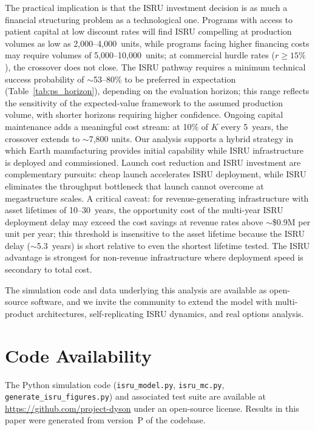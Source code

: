 \documentclass[preprint,12pt]{elsarticle}
\begin{document}
The practical implication is that the ISRU investment decision is as much a financial structuring problem as a technological one. Programs with access to patient capital at low discount rates will find ISRU compelling at production volumes as low as 2{,}000--4{,}000~units, while programs facing higher financing costs may require volumes of 5{,}000--10{,}000~units; at commercial hurdle rates ($r \geq 15\%$), the crossover does not close. The ISRU pathway requires a minimum technical success probability of $\sim$53--80\% to be preferred in expectation (Table~\ref{tab:ps_horizon}), depending on the evaluation horizon; this range reflects the sensitivity of the expected-value framework to the assumed production volume, with shorter horizons requiring higher confidence. Ongoing capital maintenance adds a meaningful cost stream: at 10\% of $K$ every 5~years, the crossover extends to $\sim$7{,}800 units. Our analysis supports a hybrid strategy in which Earth manufacturing provides initial capability while ISRU infrastructure is deployed and commissioned. Launch cost reduction and ISRU investment are complementary pursuits: cheap launch accelerates ISRU deployment, while ISRU eliminates the throughput bottleneck that launch cannot overcome at megastructure scales. A critical caveat: for revenue-generating infrastructure with asset lifetimes of 10--30~years, the opportunity cost of the multi-year ISRU deployment delay may exceed the cost savings at revenue rates above ${\sim}$\$0.9M per unit per year; this threshold is insensitive to the asset lifetime because the ISRU delay ($\sim$5.3~years) is short relative to even the shortest lifetime tested. The ISRU advantage is strongest for non-revenue infrastructure where deployment speed is secondary to total cost.

The simulation code and data underlying this analysis are available as open-source software, and we invite the community to extend the model with multi-product architectures, self-replicating ISRU dynamics, and real options analysis.

\section*{Code Availability}

The Python simulation code (\texttt{isru\_model.py}, \texttt{isru\_mc.py}, \texttt{generate\_isru\_figures.py}) and associated test suite are available at \url{https://github.com/project-dyson} under an open-source license. Results in this paper were generated from version~P of the codebase.
\end{document}
